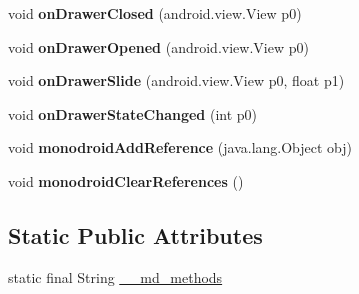 \begin{DoxyCompactItemize}
void {\bfseries on\+Drawer\+Closed} (android.\+view.\+View p0)
\item 
\mbox{\label{classmd5270abb39e60627f0f200893b490a1ade_1_1MasterDetailPageRenderer_a8f3d2e1cbbd6facc7a97f551d42aa406}} 
void {\bfseries on\+Drawer\+Opened} (android.\+view.\+View p0)
\item 
\mbox{\label{classmd5270abb39e60627f0f200893b490a1ade_1_1MasterDetailPageRenderer_a2b686422ecd14425a2f7e82787bee6c5}} 
void {\bfseries on\+Drawer\+Slide} (android.\+view.\+View p0, float p1)
\item 
\mbox{\label{classmd5270abb39e60627f0f200893b490a1ade_1_1MasterDetailPageRenderer_a7b71dfbad27df2ecd675d05527840364}} 
void {\bfseries on\+Drawer\+State\+Changed} (int p0)
\item 
\mbox{\label{classmd5270abb39e60627f0f200893b490a1ade_1_1MasterDetailPageRenderer_ab2fa5ebe17fc669eac3c6d47a4fb2e0a}} 
void {\bfseries monodroid\+Add\+Reference} (java.\+lang.\+Object obj)
\item 
\mbox{\label{classmd5270abb39e60627f0f200893b490a1ade_1_1MasterDetailPageRenderer_a147e9c7ff151c01ebef6fade3b8600d8}} 
void {\bfseries monodroid\+Clear\+References} ()
\end{DoxyCompactItemize}
\subsection*{Static Public Attributes}
\begin{DoxyCompactItemize}
\item 
static final String \hyperlink{classmd5270abb39e60627f0f200893b490a1ade_1_1MasterDetailPageRenderer_a6531570f30e058588a00d29aa7c87230}{\+\_\+\+\_\+md\+\_\+methods}
\end{DoxyCompactItemize}
